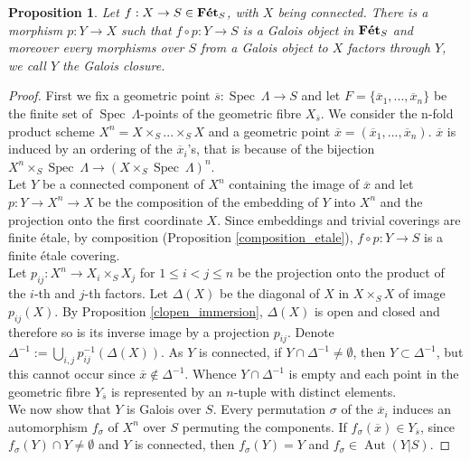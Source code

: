 \documentclass{article}
\theoremstyle{plain}
\newtheorem{proposition}[theorem]{Proposition}
\theoremstyle{definition}
\DeclareMathOperator{\Aut}{Aut}
\DeclareMathOperator{\Spec}{Spec}
\DeclareMathOperator{\Fet}{\bf{F\acute{e}t}}
\begin{document}
\begin{proposition}
\label{Galois_embed_etale_cover}
    Let $f:X\rightarrow S\in \Fet_S$, with $X$ being connected. There is a morphism $p:Y\rightarrow X$ such that $f\circ p : Y\rightarrow S$ is a Galois object in $\Fet_S$ and 
    moreover every morphisms over $S$ from a Galois object to $X$ factors through $Y$, we call $Y$ the Galois closure.
\end{proposition}
\begin{proof}
    First we fix a geometric point $\overline{s}:\Spec\:\Lambda\rightarrow S$ and let $F=\{\overline{x}_1,...,\overline{x}_n\}$ be the finite set of $\Spec\:\Lambda$-points of the geometric fibre $X_{\overline{s}}$.
    We consider the n-fold product scheme $X^n = X\times_S ...\times_S X$ and a geometric point $\overline{x} = (\overline{x}_1, ..., \overline{x}_n)$. $\overline{x}$ is induced by an ordering of the $\overline{x}_i$'s, that is because of the bijection $X^n\times_S\Spec\:\Lambda \rightarrow (X\times_S\Spec\:\Lambda)^n$.\\
    Let $Y$ be a connected component of $X^n$ containing the image of $\overline{x}$
    and let $p:Y\rightarrow X^n\rightarrow X$ be the composition of the embedding of $Y$ into $X^n$ and the projection onto the first coordinate $X$. Since embeddings and trivial coverings are finite \'etale, by composition (Proposition \ref{composition_etale}), $f\circ p :Y\rightarrow S$ is a finite \'etale covering.\\
    Let $p_{ij} : X^n \rightarrow X_i\times_SX_j$ for $1\leq i <j\leq n$ be the projection onto the product of the $i$-th and $j$-th factors. Let $\Delta(X)$ be the diagonal of $X$ in $X\times_S X$ of image $p_{ij}(X)$. By Proposition \ref{clopen_immersion}, $\Delta(X)$ is open and closed and therefore so is its inverse image by a projection $p_{ij}$. 
    Denote $\Delta^{-1} := \bigcup_{i,j} p_{ij}^{-1}(\Delta(X))$.
    As $Y$ is connected, if $Y\cap \Delta^{-1} \neq \emptyset$, then $Y\subset \Delta^{-1}$, but this cannot occur since $\overline{x} \notin \Delta^{-1}$. Whence $Y\cap \Delta^{-1}$ is empty and each point in the geometric fibre $Y_{\overline{s}}$ is represented by an $n$-tuple with distinct elements.\\
    We now show that $Y$ is Galois over $S$. 
    Every permutation $\sigma$ of the $\overline{x}_i$ induces an automorphism $f_{\sigma}$ of $X^n$ over $S$ permuting the components. 
    If $f_{\sigma}(\overline{x}) \in Y_{\overline{s}}$, since $f_{\sigma}(Y)\cap Y \neq \emptyset$ and $Y$ is connected, then $f_{\sigma}(Y) = Y$ and  $f_{\sigma}\in \Aut(Y|S)$.

\end{proof}
\end{document}
